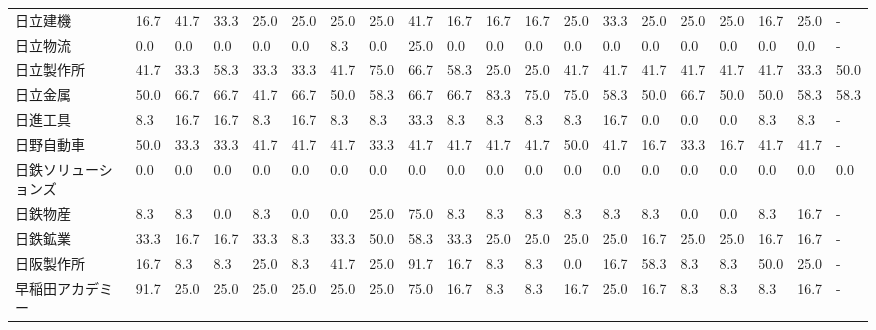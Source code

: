 \documentclass[a4paper，11pt]{jsarticle}
\begin{document}
\begin{longtable}[c]{lp{3mm}p{3mm}p{3mm}p{3mm}p{3mm}p{3mm}p{3mm}p{3mm}p{3mm}p{3mm}p{3mm}p{3mm}p{3mm}p{3mm}p{3mm}p{3mm}p{3mm}p{3mm}p{3mm}}
日立建機            &   16.7 &   41.7 &      33.3 &      25.0 &       25.0 &   25.0 &   25.0 &   41.7 &    16.7 &    16.7 &   16.7 &  25.0 &   33.3 &    25.0 &    25.0 &  25.0 &  16.7 &  25.0 &     - \\
日立物流            &    0.0 &    0.0 &       0.0 &       0.0 &        0.0 &    8.3 &    0.0 &   25.0 &     0.0 &     0.0 &    0.0 &   0.0 &    0.0 &     0.0 &     0.0 &   0.0 &   0.0 &   0.0 &     - \\
日立製作所           &   41.7 &   33.3 &      58.3 &      33.3 &       33.3 &   41.7 &   75.0 &   66.7 &    58.3 &    25.0 &   25.0 &  41.7 &   41.7 &    41.7 &    41.7 &  41.7 &  41.7 &  33.3 &  50.0 \\
日立金属            &   50.0 &   66.7 &      66.7 &      41.7 &       66.7 &   50.0 &   58.3 &   66.7 &    66.7 &    83.3 &   75.0 &  75.0 &   58.3 &    50.0 &    66.7 &  50.0 &  50.0 &  58.3 &  58.3 \\
日進工具            &    8.3 &   16.7 &      16.7 &       8.3 &       16.7 &    8.3 &    8.3 &   33.3 &     8.3 &     8.3 &    8.3 &   8.3 &   16.7 &     0.0 &     0.0 &   0.0 &   8.3 &   8.3 &     - \\
日野自動車           &   50.0 &   33.3 &      33.3 &      41.7 &       41.7 &   41.7 &   33.3 &   41.7 &    41.7 &    41.7 &   41.7 &  50.0 &   41.7 &    16.7 &    33.3 &  16.7 &  41.7 &  41.7 &     - \\
日鉄ソリューションズ      &    0.0 &    0.0 &       0.0 &       0.0 &        0.0 &    0.0 &    0.0 &    0.0 &     0.0 &     0.0 &    0.0 &   0.0 &    0.0 &     0.0 &     0.0 &   0.0 &   0.0 &   0.0 &   0.0 \\
日鉄物産            &    8.3 &    8.3 &       0.0 &       8.3 &        0.0 &    0.0 &   25.0 &   75.0 &     8.3 &     8.3 &    8.3 &   8.3 &    8.3 &     8.3 &     0.0 &   0.0 &   8.3 &  16.7 &     - \\
日鉄鉱業            &   33.3 &   16.7 &      16.7 &      33.3 &        8.3 &   33.3 &   50.0 &   58.3 &    33.3 &    25.0 &   25.0 &  25.0 &   25.0 &    16.7 &    25.0 &  25.0 &  16.7 &  16.7 &     - \\
日阪製作所           &   16.7 &    8.3 &       8.3 &      25.0 &        8.3 &   41.7 &   25.0 &   91.7 &    16.7 &     8.3 &    8.3 &   0.0 &   16.7 &    58.3 &     8.3 &   8.3 &  50.0 &  25.0 &     - \\
早稲田アカデミー        &   91.7 &   25.0 &      25.0 &      25.0 &       25.0 &   25.0 &   25.0 &   75.0 &    16.7 &     8.3 &    8.3 &  16.7 &   25.0 &    16.7 &     8.3 &   8.3 &   8.3 &  16.7 &     - \\

\end{longtable}
\end{document}

